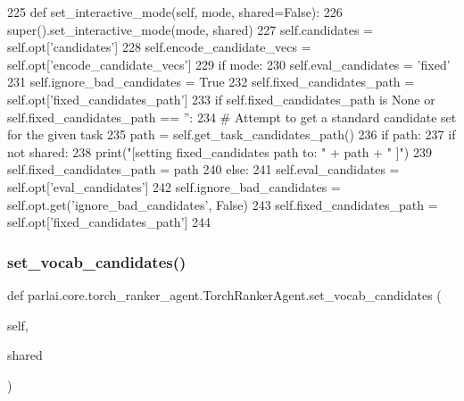 \begin{DoxyCode}
225     \textcolor{keyword}{def }set\_interactive\_mode(self, mode, shared=False):
226         super().set\_interactive\_mode(mode, shared)
227         self.candidates = self.opt[\textcolor{stringliteral}{'candidates'}]
228         self.encode\_candidate\_vecs = self.opt[\textcolor{stringliteral}{'encode\_candidate\_vecs'}]
229         \textcolor{keywordflow}{if} mode:
230             self.eval\_candidates = \textcolor{stringliteral}{'fixed'}
231             self.ignore\_bad\_candidates = \textcolor{keyword}{True}
232             self.fixed\_candidates\_path = self.opt[\textcolor{stringliteral}{'fixed\_candidates\_path'}]
233             \textcolor{keywordflow}{if} self.fixed\_candidates\_path \textcolor{keywordflow}{is} \textcolor{keywordtype}{None} \textcolor{keywordflow}{or} self.fixed\_candidates\_path == \textcolor{stringliteral}{''}:
234                 \textcolor{comment}{# Attempt to get a standard candidate set for the given task}
235                 path = self.get\_task\_candidates\_path()
236                 \textcolor{keywordflow}{if} path:
237                     \textcolor{keywordflow}{if} \textcolor{keywordflow}{not} shared:
238                         print(\textcolor{stringliteral}{"[setting fixed\_candidates path to: "} + path + \textcolor{stringliteral}{" ]"})
239                     self.fixed\_candidates\_path = path
240         \textcolor{keywordflow}{else}:
241             self.eval\_candidates = self.opt[\textcolor{stringliteral}{'eval\_candidates'}]
242             self.ignore\_bad\_candidates = self.opt.get(\textcolor{stringliteral}{'ignore\_bad\_candidates'}, \textcolor{keyword}{False})
243             self.fixed\_candidates\_path = self.opt[\textcolor{stringliteral}{'fixed\_candidates\_path'}]
244 
\end{DoxyCode}
\mbox{\label{classparlai_1_1core_1_1torch__ranker__agent_1_1TorchRankerAgent_a41c604613a97e566bfcc31667d0dfc6a}} 
\subsubsection{\texorpdfstring{set\+\_\+vocab\+\_\+candidates()}{set\_vocab\_candidates()}}
{\footnotesize\ttfamily def parlai.\+core.\+torch\+\_\+ranker\+\_\+agent.\+Torch\+Ranker\+Agent.\+set\+\_\+vocab\+\_\+candidates (\begin{DoxyParamCaption}\item[{}]{self,  }\item[{}]{shared }\end{DoxyParamCaption})}

